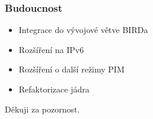 \documentclass{beamer}
\begin{document}
\begin{frame}\frametitle{Budoucnost}
  \begin{itemize}
    \item Integrace do vývojové větve BIRDa
    \item Rozšíření na IPv6
    \item Rozšíření o další režimy PIM
    \item Refaktorizace jádra
  \end{itemize}
\end{frame}

\begin{frame}[plain]
  \begin{center}
    Děkuji za pozornost.
  \end{center}
\end{frame}
\end{document}
